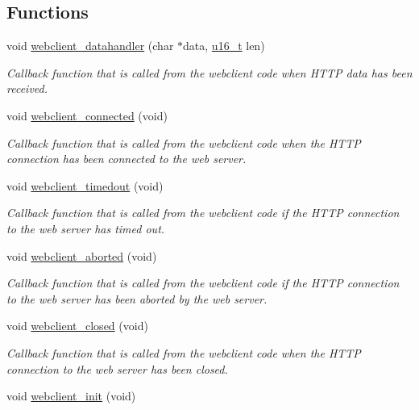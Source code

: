 \subsection*{Functions}
\begin{CompactItemize}
\item 
void \hyperlink{a00079_gc4b119801e50cc1824498a1cdf9adc37}{webclient\_\-datahandler} (char $\ast$data, \hyperlink{a00070_gfc6499c1f28697aa3bfc2804d496fd11}{u16\_\-t} len)
\begin{CompactList}\small\item\em Callback function that is called from the webclient code when HTTP data has been received. \item\end{CompactList}\item 
void \hyperlink{a00079_g6b942c1ef22f8cd1a726ef3364c9fbea}{webclient\_\-connected} (void)
\begin{CompactList}\small\item\em Callback function that is called from the webclient code when the HTTP connection has been connected to the web server. \item\end{CompactList}\item 
void \hyperlink{a00079_g23705efb9077187881f094fc9be13bde}{webclient\_\-timedout} (void)
\begin{CompactList}\small\item\em Callback function that is called from the webclient code if the HTTP connection to the web server has timed out. \item\end{CompactList}\item 
void \hyperlink{a00079_gf11d9915ec12a8cdd9fdcbb5e8fcd5c7}{webclient\_\-aborted} (void)
\begin{CompactList}\small\item\em Callback function that is called from the webclient code if the HTTP connection to the web server has been aborted by the web server. \item\end{CompactList}\item 
void \hyperlink{a00079_gf8f12c820cc08da32aa62898bfc02db3}{webclient\_\-closed} (void)
\begin{CompactList}\small\item\em Callback function that is called from the webclient code when the HTTP connection to the web server has been closed. \item\end{CompactList}\item 
\hypertarget{a00079_g3caacabb2fe1c71921e1a471719ccbd2}{
void \hyperlink{a00079_g3caacabb2fe1c71921e1a471719ccbd2}{webclient\_\-init} (void)}
\label{a00079_g3caacabb2fe1c71921e1a471719ccbd2}


\end{CompactItemize}
